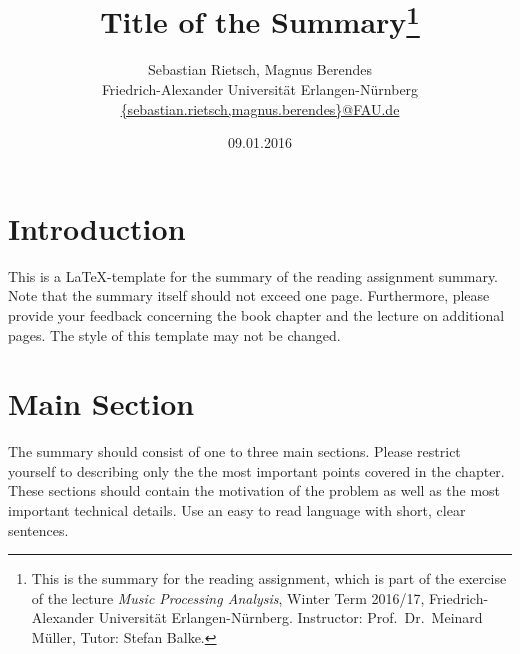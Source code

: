 \documentclass[a4paper, 9pt, twocolumn]{extarticle}
\begin{document}
\date{\normalsize 09.01.2016}

\title{\vspace{-8mm}\textbf{\Large
Title of the Summary\footnote{This is the summary for the reading assignment,
which is part of the exercise of the lecture \emph{Music Processing Analysis}, Winter Term 2016/17,
Friedrich-Alexander Universit\"at Erlangen-N\"urnberg.
Instructor: Prof.\ Dr.\ Meinard M\"uller,
Tutor: Stefan Balke.
}}}

\author{
{
\begin{minipage}{\textwidth}
\center
Sebastian Rietsch, Magnus Berendes\\
\small
Friedrich-Alexander Universit\"at Erlangen-N\"urnberg
\protect\\{} %
	\url{{sebastian.rietsch,magnus.berendes}@FAU.de}
\end{minipage}
}
}

\maketitle
\thispagestyle{empty}

\section{Introduction}
\label{section:introduction}

This is a \LaTeX-template for the summary of the reading assignment summary. Note that the summary
itself should not exceed one page. Furthermore, please provide your feedback concerning the
book chapter and the lecture on additional pages.
The style of this template may not be changed.



\section{Main Section}
\label{section:main}

The summary should consist of one to three main sections.
Please restrict yourself to describing only the the most
important points covered in the chapter. These sections
should contain the motivation of the problem as well as
the most important technical details. Use an easy to read
language with short, clear sentences.
\end{document}
